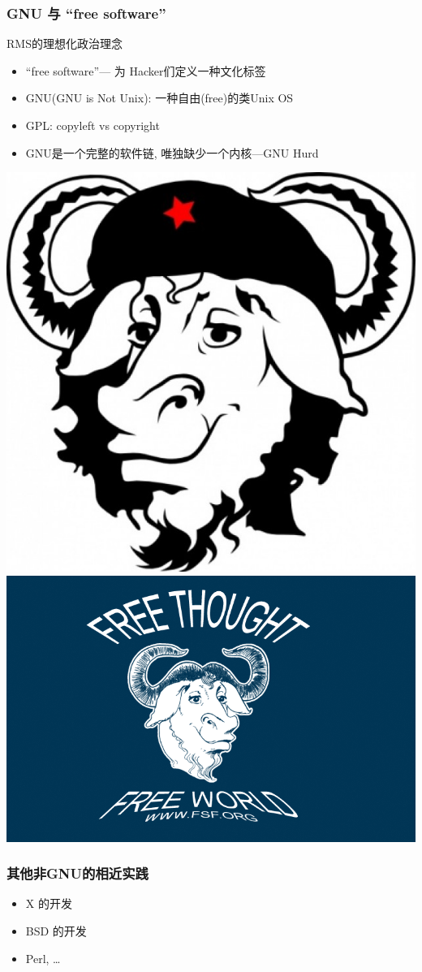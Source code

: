 \documentclass[compress]{beamer}
\begin{document}
\begin{frame}
\frametitle{GNU 与 ``free software''}

\begin{block}{RMS的理想化政治理念}
\begin{itemize}
    \item ``free software''--- 为 Hacker们定义一种文化标签 
    \item GNU(GNU is Not Unix): 一种自由(free)的类Unix OS
	\item GPL: copyleft vs copyright
    \item GNU是一个完整的软件链, 唯独缺少一个内核---GNU Hurd
\end{itemize}
\end{block}
\begin{center}
\hfill\includegraphics[width=0.25\hsize]{gnu-cap.jpg}\hfill%
\includegraphics[width=0.4\hsize]{gnublue.png}\hfill
\end{center}
\end{frame}

\begin{frame}
    \frametitle{其他非GNU的相近实践}
\begin{itemize}
    \item X 的开发
    \item BSD 的开发
	\item Perl,  \ldots
\end{itemize}
\end{frame}
\end{document}
